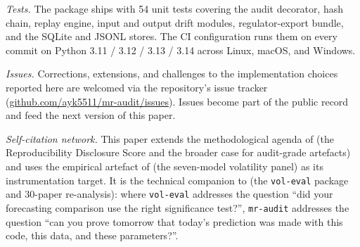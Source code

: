 \textit{Tests.} The package ships with 54 unit tests covering the audit decorator, hash chain, replay engine, input and output drift modules, regulator-export bundle, and the SQLite and JSONL stores. The CI configuration runs them on every commit on Python 3.11 / 3.12 / 3.13 / 3.14 across Linux, macOS, and Windows.

\textit{Issues.} Corrections, extensions, and challenges to the implementation choices reported here are welcomed via the repository's issue tracker (\href{https://github.com/ayk5511/mr-audit/issues}{github.com/ayk5511/mr-audit/issues}). Issues become part of the public record and feed the next version of this paper.

\textit{Self-citation network.} This paper extends the methodological agenda of \citet{Khan2026Survey} (the Reproducibility Disclosure Score and the broader case for audit-grade artefacts) and uses the empirical artefact of \citet{KhanVol2026} (the seven-model volatility panel) as its instrumentation target. It is the technical companion to \citet{Khan2026VolEval} (the \texttt{vol-eval} package and 30-paper re-analysis): where \texttt{vol-eval} addresses the question ``did your forecasting comparison use the right significance test?'', \texttt{mr-audit} addresses the question ``can you prove tomorrow that today's prediction was made with this code, this data, and these parameters?''.
